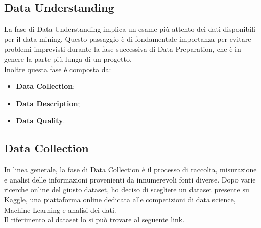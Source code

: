\documentclass{article}
\begin{document}
\begin{titlepage}
        \newpage
        \section{Data Understanding}
        La fase di Data Understanding implica un esame più attento dei dati disponibili per il data mining. Questo passaggio è di fondamentale importanza per evitare problemi imprevisti durante la fase successiva di Data Preparation, che è in genere la parte più lunga di un progetto. \\
        Inoltre questa fase è composta da:
        \begin{itemize}
            \item \textbf{Data Collection};
            \item \textbf{Data Description};
            \item \textbf{Data Quality}.
        \end{itemize}

         \subsection{Data Collection}
         In linea generale, la fase di Data Collection è il processo di raccolta, misurazione e analisi delle informazioni provenienti da innumerevoli fonti diverse. Dopo varie ricerche online del giusto dataset, ho deciso di scegliere un dataset presente su Kaggle,  una piattaforma online dedicata alle competizioni di data science, Machine Learning e analisi dei dati. \\Il riferimento al dataset lo si può trovare al seguente \href{https://www.kaggle.com/datasets/uciml/red-wine-quality-cortez-et-al-2009}{link}.


\end{titlepage}
\end{document}
